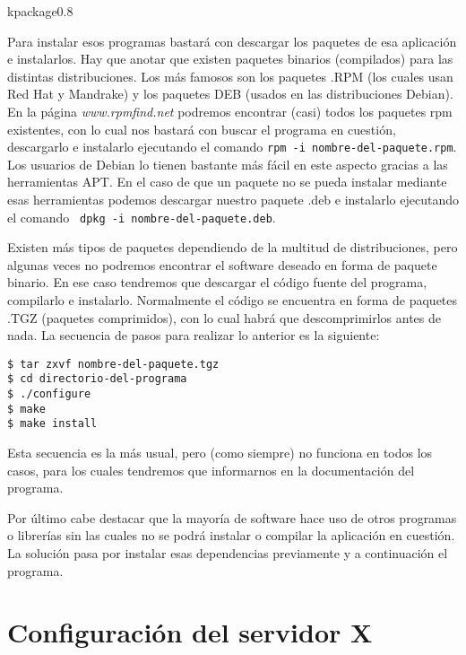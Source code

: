 \begin{figura}{kpackage}{0.8}
\caption{KPackage. Gestor de paquetes RPM y DEB para KDE}
\end{figura}

Para instalar esos programas bastará con descargar los paquetes de esa
aplicación e instalarlos. Hay que anotar que existen paquetes binarios
(compilados) para  las distintas  distribuciones. Los más  famosos son
los  paquetes  .RPM  (los  cuales  usan Red  Hat  y  Mandrake)  y  los
paquetes DEB (usados en las  distribuciones Debian). En la página {\em
www.rpmfind.net}  podremos encontrar  (casi)  todos  los paquetes  rpm
existentes,  con  lo  cual  nos  bastará con  buscar  el  programa  en
cuestión, descargarlo e  instalarlo ejecutando el comando  {\tt rpm -i
nombre-del-paquete.rpm}. Los usuarios de Debian lo tienen bastante más
fácil en  este aspecto gracias a  las herramientas APT. En  el caso de
que un paquete no se pueda instalar mediante esas herramientas podemos
descargar nuestro paquete .deb e instalarlo ejecutando el comando {\tt
dpkg -i nombre-del-paquete.deb}.

Existen  más  tipos   de  paquetes  dependiendo  de   la  multitud  de
distribuciones, pero  algunas veces no podremos  encontrar el software
deseado  en  forma de  paquete  binario.  En  ese caso  tendremos  que
descargar  el código  fuente  del programa,  compilarlo e  instalarlo.
Normalmente el código se encuentra en forma de paquetes .TGZ (paquetes
comprimidos), con lo cual habrá  que descomprimirlos antes de nada. La
secuencia de pasos para realizar lo anterior es la siguiente:

\begin{verbatim}
$ tar zxvf nombre-del-paquete.tgz
$ cd directorio-del-programa
$ ./configure
$ make
$ make install
\end{verbatim}

Esta secuencia  es la más  usual, pero  (como siempre) no  funciona en
todos  los casos,  para los  cuales  tendremos que  informarnos en  la
documentación del programa. 

Por último cabe destacar que la  mayoría de software hace uso de otros
programas o librerías  sin las cuales no se podrá  instalar o compilar
la  aplicación  en  cuestión.  La  solución  pasa  por  instalar  esas
dependencias previamente y a continuación el programa.


\section{Configuración del servidor X}

